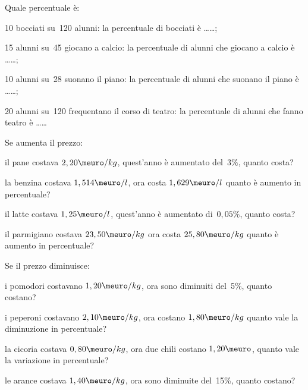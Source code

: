 \begin{esercizio}
 \label{ese:3.91}
Quale percentuale è:
\begin{enumeratees}
 \item 10 bocciati su~120 alunni: la percentuale di bocciati è \ldots\ldots;
 \item 15 alunni su~45 giocano a calcio: la percentuale di alunni che giocano 
 a calcio è \ldots\ldots;
 \item 10 alunni su~28 suonano il piano: la percentuale di alunni che suonano 
 il piano è \ldots\ldots;
 \item 20 alunni su~120 frequentano il corso di teatro: la percentuale di 
 alunni che fanno teatro è \ldots\ldots
\end{enumeratees}
\end{esercizio}


\begin{esercizio}
 \label{ese:3.92}
Se aumenta il prezzo:
\begin{enumeratees}
\item il pane costava \(2,20\meuro/kg\), quest'anno 
è aumentato del~\(3\%\), quanto costa?
\item la benzina costava \(1,514\meuro/l\), 
ora costa \(1,629\meuro/l\) quanto è aumento in percentuale?
\item il latte costava \(1,25\meuro/l\), 
quest'anno è aumentato di~\(0,05\%\), quanto costa?
\item il parmigiano costava  \(23,50\meuro/kg\) 
ora costa \(25,80\meuro/kg\) quanto è aumento in percentuale?
\end{enumeratees}
\end{esercizio}

\begin{esercizio}
 \label{ese:3.93}
Se il prezzo diminuisce:
\begin{enumeratees}
\item i pomodori costavano \(1,20\meuro/kg\), 
ora sono diminuiti del~5\%, quanto costano?
\item i peperoni costavano \(2,10\meuro/kg\), 
ora costano \(1,80\meuro/kg\) quanto vale la diminuzione in percentuale?
\item la cicoria costava \(0,80\meuro/kg\), 
ora due chili costano \(1,20\meuro\), quanto vale la variazione in 
percentuale?
\item le arance costava \(1,40\meuro/kg\), 
ora sono diminuite del~15\%, quanto costano?
\end{enumeratees}
\end{esercizio}

